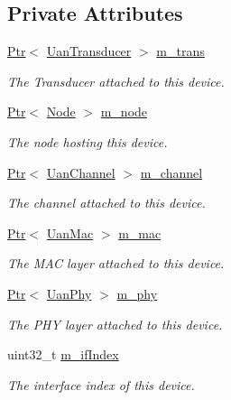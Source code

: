 \subsection*{Private Attributes}
\begin{DoxyCompactItemize}
\item 
\hyperlink{classns3_1_1Ptr}{Ptr}$<$ \hyperlink{classns3_1_1UanTransducer}{Uan\+Transducer} $>$ \hyperlink{classns3_1_1UanNetDevice_a9576fcd3b2e1f07fbb0c7125f905f0e0}{m\+\_\+trans}
\begin{DoxyCompactList}\small\item\em The Transducer attached to this device. \end{DoxyCompactList}\item 
\hyperlink{classns3_1_1Ptr}{Ptr}$<$ \hyperlink{classns3_1_1Node}{Node} $>$ \hyperlink{classns3_1_1UanNetDevice_a762b0c54b288f7df70ecc7a701d6a720}{m\+\_\+node}
\begin{DoxyCompactList}\small\item\em The node hosting this device. \end{DoxyCompactList}\item 
\hyperlink{classns3_1_1Ptr}{Ptr}$<$ \hyperlink{classns3_1_1UanChannel}{Uan\+Channel} $>$ \hyperlink{classns3_1_1UanNetDevice_ab528925b6ada30cd1e9a8acc23a4f9dd}{m\+\_\+channel}
\begin{DoxyCompactList}\small\item\em The channel attached to this device. \end{DoxyCompactList}\item 
\hyperlink{classns3_1_1Ptr}{Ptr}$<$ \hyperlink{classns3_1_1UanMac}{Uan\+Mac} $>$ \hyperlink{classns3_1_1UanNetDevice_af07aff40dbb010fd62ad0fdcbf394995}{m\+\_\+mac}
\begin{DoxyCompactList}\small\item\em The M\+AC layer attached to this device. \end{DoxyCompactList}\item 
\hyperlink{classns3_1_1Ptr}{Ptr}$<$ \hyperlink{classns3_1_1UanPhy}{Uan\+Phy} $>$ \hyperlink{classns3_1_1UanNetDevice_a844d7ac9f29552eebf86d2f7cbf3c39c}{m\+\_\+phy}
\begin{DoxyCompactList}\small\item\em The P\+HY layer attached to this device. \end{DoxyCompactList}\item 
uint32\+\_\+t \hyperlink{classns3_1_1UanNetDevice_a3416bb182a67acc209637bfe619a76f6}{m\+\_\+if\+Index}
\begin{DoxyCompactList}\small\item\em The interface index of this device. \end{DoxyCompactList}\item 

\end{DoxyCompactItemize}
